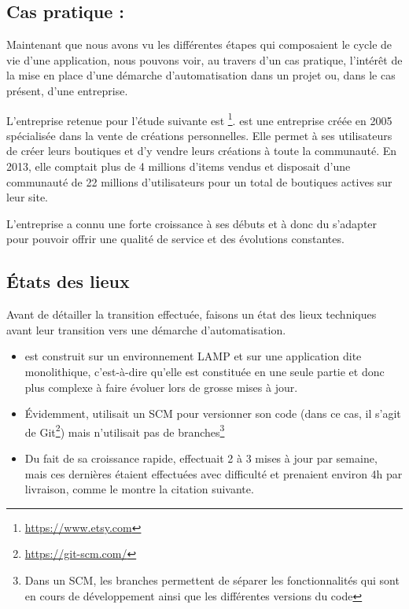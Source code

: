 \subsection{Cas pratique : \etsy}

Maintenant que nous avons vu les différentes étapes qui composaient le cycle de vie d'une application, nous pouvons voir, au travers d'un cas pratique, l'intérêt de la mise en place d'une démarche d'automatisation dans un projet ou, dans le cas présent, d'une entreprise.


L'entreprise retenue pour l'étude suivante est \etsy\footnote{\url{https://www.etsy.com}}. \etsy{} est une entreprise créée en 2005 spécialisée dans la vente de créations personnelles. Elle permet à ses utilisateurs de créer leurs boutiques et d'y vendre leurs créations à toute la communauté. En 2013, elle comptait plus de 4 millions d'items vendus et disposait d'une communauté de 22 millions d'utilisateurs pour un total de  boutiques actives sur leur site.

L'entreprise a connu une forte croissance à ses débuts et à donc du s'adapter pour pouvoir offrir une qualité de service et des évolutions constantes.

\subsection{États des lieux}

Avant de détailler la transition effectuée, faisons un état des lieux techniques avant leur transition vers une démarche d'automatisation.

\begin{itemize}
	\setlength\itemsep{0em}
	\item \etsy{} est construit sur un environnement \gls{LAMP} et sur une application dite monolithique, c'est-à-dire qu'elle est constituée en une seule partie et donc plus complexe à faire évoluer lors de grosse mises à jour.
	\item Évidemment, \etsy{} utilisait un \gls{SCM} pour versionner son code (dans ce cas, il s'agit de Git\footnote{\url{https://git-scm.com/}}) mais n'utilisait pas de branches\footnote{Dans un \gls{SCM}, les branches permettent de séparer les fonctionnalités qui sont en cours de développement ainsi que les différentes versions du code}
	\item Du fait de sa croissance rapide, \etsy{} effectuait 2 à 3 mises à jour par semaine, mais ces dernières étaient effectuées avec difficulté et prenaient environ 4h par livraison, comme le montre la citation suivante. 
\end{itemize}

